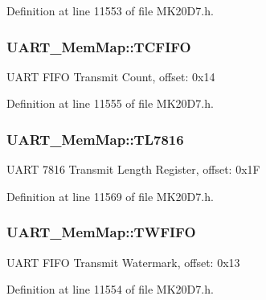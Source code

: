 Definition at line 11553 of file M\+K20\+D7.\+h.

\subsubsection[{\texorpdfstring{T\+C\+F\+I\+FO}{TCFIFO}}]{ U\+A\+R\+T\+\_\+\+Mem\+Map\+::\+T\+C\+F\+I\+FO}\hypertarget{struct_u_a_r_t___mem_map_a46f296d6f9aead85a8aa286f9ed21ec6}{}\label{struct_u_a_r_t___mem_map_a46f296d6f9aead85a8aa286f9ed21ec6}
U\+A\+RT F\+I\+FO Transmit Count, offset\+: 0x14 

Definition at line 11555 of file M\+K20\+D7.\+h.

\subsubsection[{\texorpdfstring{T\+L7816}{TL7816}}]{ U\+A\+R\+T\+\_\+\+Mem\+Map\+::\+T\+L7816}\hypertarget{struct_u_a_r_t___mem_map_ab93bfbd2b99631b8f3c8ca6c8e482310}{}\label{struct_u_a_r_t___mem_map_ab93bfbd2b99631b8f3c8ca6c8e482310}
U\+A\+RT 7816 Transmit Length Register, offset\+: 0x1F 

Definition at line 11569 of file M\+K20\+D7.\+h.

\subsubsection[{\texorpdfstring{T\+W\+F\+I\+FO}{TWFIFO}}]{ U\+A\+R\+T\+\_\+\+Mem\+Map\+::\+T\+W\+F\+I\+FO}\hypertarget{struct_u_a_r_t___mem_map_a4c4b96943ef98aa41f68416b2789d190}{}\label{struct_u_a_r_t___mem_map_a4c4b96943ef98aa41f68416b2789d190}
U\+A\+RT F\+I\+FO Transmit Watermark, offset\+: 0x13 

Definition at line 11554 of file M\+K20\+D7.\+h.

